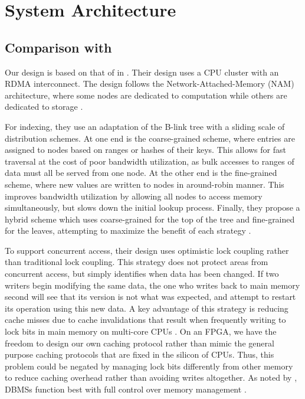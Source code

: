 \chapter{System Architecture}

\section{Comparison with \citeauthor{base}}

Our design is based on that of \citeauthor{base} in . Their design uses a CPU cluster with an RDMA interconnect. The design follows the Network-Attached-Memory (NAM) architecture, where some nodes are dedicated to computation while others are dedicated to storage \autocite{base,binnig-vldb-2016}.

For indexing, they use an adaptation of the B-link tree with a sliding scale of distribution schemes. At one end is the coarse-grained scheme, where entries are assigned to nodes based on ranges or hashes of their keys. This allows for fast traversal at the cost of poor bandwidth utilization, as bulk accesses to ranges of data must all be served from one node. At the other end is the fine-grained scheme, where new values are written to nodes in around-robin manner. This improves bandwidth utilization by allowing all nodes to access memory simultaneously, but slows down the initial lookup process. Finally, they propose a hybrid scheme which uses coarse-grained for the top of the tree and fine-grained for the leaves, attempting to maximize the benefit of each strategy \autocite{base}.

To support concurrent access, their design uses optimistic lock coupling rather than traditional lock coupling. This strategy does not protect areas from concurrent access, but simply identifies when data has been changed. If two writers begin modifying the same data, the one who writes back to main memory second will see that its version is not what was expected, and attempt to restart its operation using this new data. A key advantage of this strategy is reducing cache misses due to cache invalidations that result when frequently writing to lock bits in main memory on multi-core CPUs \autocite{leis-damon-2016}. On an FPGA, we have the freedom to design our own caching protocol rather than mimic the general purpose caching protocols that are fixed in the silicon of CPUs. Thus, this problem could be negated by managing lock bits differently from other memory to reduce caching overhead rather than avoiding writes altogether. As noted by \citeauthor{binnig-vldb-2016}, DBMSs function best with full control over memory management \autocite{binnig-vldb-2016}.


